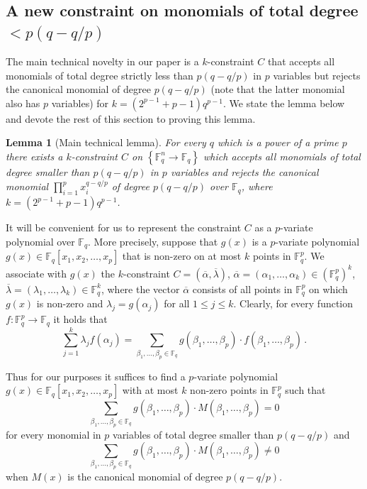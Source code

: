 \documentclass[10pt]{article}
\newtheorem{lemma}[theorem]{Lemma}
\theoremstyle{definition}
\numberwithin{equation}{section}
\newcommand{\F}{{\mathbb{F}}}
\newcommand{\set}[1]{\left\{{#1}\right\}}
\begin{document}
\subsection{A new constraint on monomials of total degree
  \texorpdfstring{$< p(q - q/p)$}{< p(p - q/p)}}\label{sec:main-lemma}

The main technical novelty in our paper is a $k$-constraint $C$ 
that accepts all monomials of total degree strictly less than
$p(q-q/p)$ in $p$ variables but rejects the canonical monomial of degree $p(q-q/p)$
(note that the latter monomial also has $p$ variables) for
$k= (2^{p-1}+p-1)q^{p-1}$. We state the lemma below and devote the
rest of this section to proving this lemma.

\begin{lemma}[Main technical lemma]\label{lem:main-technical}
For every $q$ which is a power of a prime $p$ there exists a
$k$-constraint $C$ on $\set{\F_q^n \to \F_q}$ which accepts all monomials of total degree smaller than $p(q-q/p)$ in $p$
variables and rejects the canonical monomial $\prod_{i=1}^{p} x_i^{q-q/p}$
of degree $p(q-q/p)$  over $\F_q$, where $k = (2^{p-1}+p-1)q^{p-1}$.
\end{lemma}


It will be convenient for us to represent the constraint $C$ as a $p$-variate polynomial over $\F_q$. More precisely, suppose that
 $g(x)$ is a $p$-variate polynomial $g(x) \in \F_q [x_1,x_2,\ldots,x_p]$ that is non-zero on at most $k$ points in $\F_q^p$.
We associate with $g(x)$ the $k$-constraint $C=(\overline \alpha, \overline \lambda)$,
$\overline \alpha = (\alpha_1,\ldots,\alpha_k) \in (\F_q^p)^k$,  $\overline \lambda = (\lambda_1,\ldots,\lambda_k) \in \F_q^k$, where the vector $\overline \alpha$ consists
of all points  in $\F_q^p$ on which $g(x)$ is non-zero and $\lambda_j = g(\alpha_j)$ for all $ 1 \leq j \leq k$. Clearly, for every function
$f: \F_q^p \to \F_q$ it holds that
\begin{equation*}
\sum_{j=1}^k \lambda_j f(\alpha_j) = \sum_{\beta_1, \ldots, \beta_p \in \F_q} g(\beta_1, \ldots, \beta_p) \cdot f(\beta_1, \ldots, \beta_p)\,.
\end{equation*}

Thus for our purposes it suffices to find
%
%
a $p$-variate polynomial  $g(x) \in \F_{q} [x_1,x_2,\ldots,x_p]$
 with at most $k$ non-zero points in $\F_q^p$ such that $$ \sum_{\beta_1,\ldots,\beta_p \in \F_q} g(\beta_1,\ldots,\beta_p) \cdot M(\beta_1,\ldots,\beta_p) = 0$$ for
 every monomial in $p$ variables of total degree smaller than $p(q-q/p)$ and
 $$ \sum_{\beta_1,\ldots,\beta_p \in \F_q} g(\beta_1,\ldots,\beta_p) \cdot M(\beta_1,\ldots,\beta_p) \neq 0$$ when $M(x)$ is the canonical monomial of degree $p(q-q/p)$.
\end{document}
